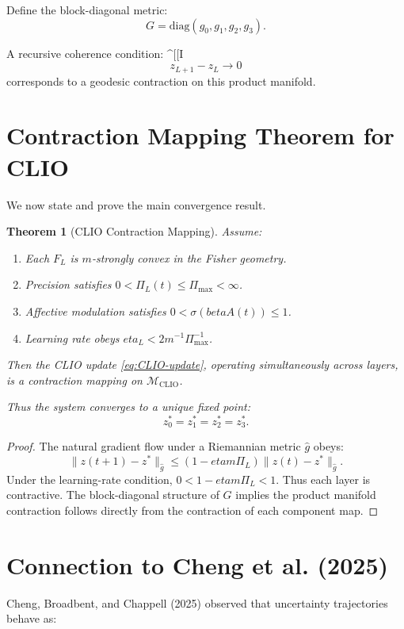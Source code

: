 \documentclass[12pt,oneside]{book}
\theoremstyle{plain}
\newtheorem{theorem}{Theorem}[chapter]
\theoremstyle{definition}
\def\beta{beta}%
\def\eta{eta}%
\begin{document}
Define the block-diagonal metric:
\[
G = \mathrm{diag}(g_0, g_1, g_2, g_3).
\]

A recursive coherence condition:
^[[I\[
z_{L+1} - z_L \rightarrow 0
\]
corresponds to a geodesic contraction on this product manifold.

\section{Contraction Mapping Theorem for CLIO}

We now state and prove the main convergence result.

\begin{theorem}[CLIO Contraction Mapping]\label{thm:CLIO-contraction}
Assume:

\begin{enumerate}
    \item Each $F_L$ is $m$-strongly convex in the Fisher geometry.
    \item Precision satisfies $0 < \Pi_L(t) \le \Pi_{\max} < \infty$.
    \item Affective modulation satisfies $0 < \sigma(\beta A(t)) \le 1$.
    \item Learning rate obeys
          $\eta_L < 2m^{-1} \Pi_{\max}^{-1}$.
\end{enumerate}

Then the CLIO update \eqref{eq:CLIO-update},
operating simultaneously across layers,
is a contraction mapping on $\mathcal{M}_{\mathrm{CLIO}}$.

Thus the system converges to a unique fixed point:
\[
z_0^\ast = z_1^\ast = z_2^\ast = z_3^\ast.
\]
\end{theorem}

\begin{proof}
The natural gradient flow under a Riemannian metric $\hat g$ obeys:
\[
\|z(t+1) - z^\ast\|_{\hat g}
\le
(1 - \eta m \Pi_L)
\|z(t) - z^\ast\|_{\hat g}.
\]
Under the learning-rate condition,
$0 < 1 - \eta m \Pi_L < 1$.
Thus each layer is contractive.
The block-diagonal structure of $G$ implies the product manifold contraction
follows directly from the contraction of each component map.
\end{proof}

\section{Connection to Cheng et al. (2025)}

Cheng, Broadbent, and Chappell (2025) \cite{Cheng2025CognitiveLV}
observed that uncertainty trajectories behave as:
\end{document}
